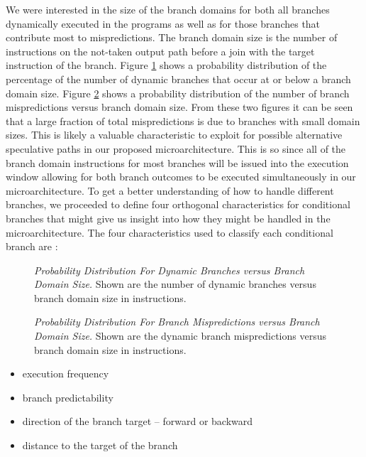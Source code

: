 \documentclass[10pt,dvips]{article}
\begin{document}
We were interested
in the size of the branch domains for both all branches
dynamically executed in the programs as well as for those branches 
that contribute most to mispredictions.  The branch domain size
is the number of instructions on the not-taken output path
before a join with the target instruction of the branch.
Figure \ref{fig:numbranches} shows a probability distribution of
the percentage of the number of dynamic branches that occur at
or below a branch domain size.  
Figure \ref{fig:mispredictions} shows a probability distribution of
the number of branch mispredictions versus
branch domain size.
From these two figures it can be seen 
that a large fraction of total mispredictions 
is due to branches with small domain
sizes. 
This is likely a valuable characteristic to exploit for
possible alternative speculative paths in our proposed
microarchitecture.  This is so since all of the branch domain
instructions for most
branches will be issued into the execution window allowing
for both branch outcomes to be executed simultaneously
in our microarchitecture.
To get a better understanding of how to handle different branches,
we proceeded to define four orthogonal characteristics
for conditional branches that might give us insight into
how they might be handled in the microarchitecture.
The four characteristics used to classify each conditional branch are :

\begin{figure}
\vspace{0.2 in}
\setlength{\epsfxsize}{10cm}%
\centerline{}
\caption{{\em Probability Distribution For Dynamic Branches versus
Branch Domain Size.} 
Shown are the number of dynamic branches versus branch domain size
in instructions.}
\label{fig:numbranches}
\end{figure}

\begin{figure}
\vspace{0.2 in}
\setlength{\epsfxsize}{10cm}%
\centerline{}
\caption{{\em Probability Distribution For Branch Mispredictions
versus Branch Domain Size.} 
Shown are the dynamic branch mispredictions versus 
branch domain size
in instructions.}
\label{fig:mispredictions}
\end{figure}

\begin{itemize}
\item{execution frequency}
\item{branch predictability}
\item{direction of the branch target -- forward or backward}
\item{distance to the target of the branch}
\end{itemize}   
\end{document}
